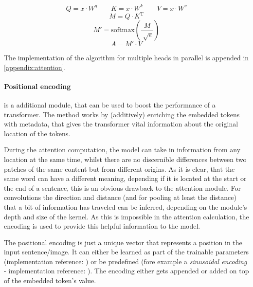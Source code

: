 \begin{equation}
    \label{eq:attention-step-1}
    Q = x \cdot W^q \qquad K = x \cdot W^k \qquad V = x \cdot W^v
\end{equation}
\begin{equation}
    \label{eq:attention-step-2}
    M = Q\cdot K^\mathrm{T}
\end{equation}
\begin{equation}
    \label{eq:attention-step-3-4}
    M' = \mathrm{softmax}\left(\frac{M}{\sqrt[]{e}}\right)
\end{equation}
\begin{equation}
    \label{eq:attention-step-5}
    A = M' \cdot V
\end{equation}

The implementation of the algorithm for multiple heads in parallel is appended in \autoref{appendix:attention}.

\FloatBarrier
\paragraph{Positional encoding} is a additional module, that can be used to boost the performance of a transformer.
The method works by (additively) enriching the embedded tokens with \glqq metadata\grqq{}, that gives the transformer vital information about the original location of the tokens.

During the attention computation, the model can take in information from any location at the same time, whilst there are no discernible differences between two patches of the same content but from different origins.
As it is clear, that the same word can have a different meaning, depending if it is located at the start or the end of a sentence, this is an obvious drawback to the attention module. 
For convolutions the direction and distance (and for pooling at least the distance) that a bit of information has traveled can be inferred, depending on the module's depth and size of the kernel. 
As this is impossible in the attention calculation, the encoding is used to provide this helpful information to the model.

The positional encoding is just a unique vector that represents a position in the input sentence/image.
It can either be learned as part of the trainable parameters (implementation reference: \cite{dinoGithub}) or be predefined (fore example a \emph{sinusoidal encoding} - implementation reference: \cite{positionalEncodingGithub}).
The encoding either gets appended or added on top of the embedded token's value.

